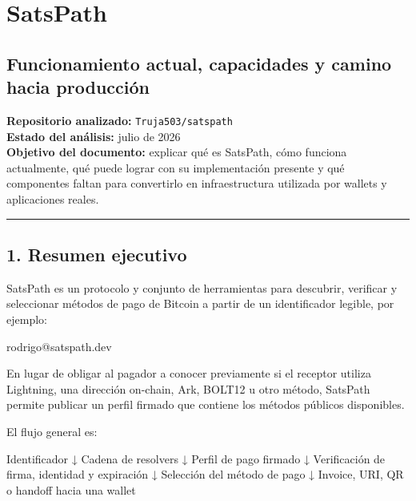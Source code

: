 \documentclass[
]{article}
\author{}
\date{}
\newenvironment{Shaded}{}{}
\newcommand{\NormalTok}[1]{#1}
\begin{document}
\hypertarget{satspath}{%
\section{SatsPath}\label{satspath}}

\hypertarget{funcionamiento-actual-capacidades-y-camino-hacia-producciuxf3n}{%
\subsection{Funcionamiento actual, capacidades y camino hacia
producción}\label{funcionamiento-actual-capacidades-y-camino-hacia-producciuxf3n}}

\textbf{Repositorio analizado:} \texttt{Truja503/satspath}\\
\textbf{Estado del análisis:} julio de 2026\\
\textbf{Objetivo del documento:} explicar qué es SatsPath, cómo funciona
actualmente, qué puede lograr con su implementación presente y qué
componentes faltan para convertirlo en infraestructura utilizada por
wallets y aplicaciones reales.

\begin{center}\rule{0.5\linewidth}{0.5pt}\end{center}

\hypertarget{resumen-ejecutivo}{%
\subsection{1. Resumen ejecutivo}\label{resumen-ejecutivo}}

SatsPath es un protocolo y conjunto de herramientas para descubrir,
verificar y seleccionar métodos de pago de Bitcoin a partir de un
identificador legible, por ejemplo:

\begin{Shaded}
\begin{Highlighting}[]
\NormalTok{rodrigo@satspath.dev}
\end{Highlighting}
\end{Shaded}

En lugar de obligar al pagador a conocer previamente si el receptor
utiliza Lightning, una dirección on-chain, Ark, BOLT12 u otro método,
SatsPath permite publicar un perfil firmado que contiene los métodos
públicos disponibles.

El flujo general es:

\begin{Shaded}
\begin{Highlighting}[]
\NormalTok{Identificador}
\NormalTok{    ↓}
\NormalTok{Cadena de resolvers}
\NormalTok{    ↓}
\NormalTok{Perfil de pago firmado}
\NormalTok{    ↓}
\NormalTok{Verificación de firma, identidad y expiración}
\NormalTok{    ↓}
\NormalTok{Selección del método de pago}
\NormalTok{    ↓}
\NormalTok{Invoice, URI, QR o handoff hacia una wallet}
\end{Highlighting}
\end{Shaded}
\end{document}
